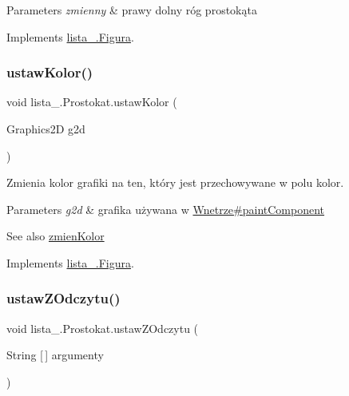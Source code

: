 \begin{DoxyParams}{Parameters}
{\em zmienny} & prawy dolny róg prostokąta \\
\hline
\end{DoxyParams}


Implements \mbox{\hyperlink{interfacelista__5_1_1_figura_a1b238957bac675c57febc970067dfd6d}{lista\+\_.\+Figura}}.

\mbox{\label{classlista__5_1_1_prostokat_ad63e4a8c7f291a54f8c9c285c8e6c8ff}} 
\subsubsection{\texorpdfstring{ustaw\+Kolor()}{ustawKolor()}}
{\footnotesize\ttfamily void lista\+\_.\+Prostokat.\+ustaw\+Kolor (\begin{DoxyParamCaption}\item[{Graphics2D}]{g2d }\end{DoxyParamCaption})}

Zmienia kolor grafiki na ten, który jest przechowywane w polu kolor. 
\begin{DoxyParams}{Parameters}
{\em g2d} & grafika używana w \mbox{\hyperlink{classlista__5_1_1_wnetrze_aa8676192e150a17230d72de122744a47}{Wnetrze\#paint\+Component}} \\
\hline
\end{DoxyParams}
\begin{DoxySeeAlso}{See also}
\mbox{\hyperlink{interfacelista__5_1_1_figura_aeb0982dc44348dd1fde9266d9d476ed0}{zmien\+Kolor}}
\end{DoxySeeAlso}
 

Implements \mbox{\hyperlink{interfacelista__5_1_1_figura_a3cc13bf7229b288d743be7903b3b61a4}{lista\+\_.\+Figura}}.

\mbox{\label{classlista__5_1_1_prostokat_a93ae9f652ca00886c05be661b17a0886}} 
\subsubsection{\texorpdfstring{ustaw\+Z\+Odczytu()}{ustawZOdczytu()}}
{\footnotesize\ttfamily void lista\+\_.\+Prostokat.\+ustaw\+Z\+Odczytu (\begin{DoxyParamCaption}\item[{String \mbox{[}$\,$\mbox{]}}]{argumenty }\end{DoxyParamCaption})}

